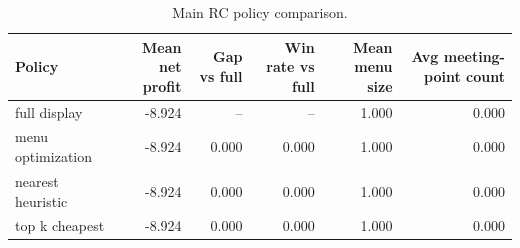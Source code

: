 \begin{table}[t]
\centering
\caption{Main RC policy comparison.}
\label{tab:smoke\_rc}
\begin{tabular}{lrrrrr}
\hline
Policy & Mean net profit & Gap vs full & Win rate vs full & Mean menu size & Avg meeting-point count \\
\hline
full display & -8.924 & -- & -- & 1.000 & 0.000 \\
menu optimization & -8.924 & 0.000 & 0.000 & 1.000 & 0.000 \\
nearest heuristic & -8.924 & 0.000 & 0.000 & 1.000 & 0.000 \\
top k cheapest & -8.924 & 0.000 & 0.000 & 1.000 & 0.000 \\
\hline
\end{tabular}
\end{table}
